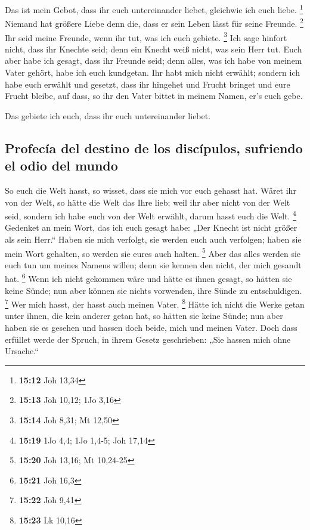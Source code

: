  Das ist mein Gebot, dass ihr euch untereinander liebet,
gleichwie ich euch liebe. \footnote{\textbf{15:12} Joh 13,34}
 Niemand hat größere Liebe denn die, dass er sein Leben
lässt für seine Freunde. \footnote{\textbf{15:13} Joh 10,12; 1Jo 3,16}
 Ihr seid meine Freunde, wenn ihr tut, was ich euch
gebiete. \footnote{\textbf{15:14} Joh 8,31; Mt 12,50} 
Ich sage hinfort nicht, dass ihr Knechte seid; denn ein Knecht weiß
nicht, was sein Herr tut. Euch aber habe ich gesagt, dass ihr Freunde
seid; denn alles, was ich habe von meinem Vater gehört, habe ich euch
kundgetan.  Ihr habt mich nicht erwählt; sondern ich habe
euch erwählt und gesetzt, dass ihr hingehet und Frucht bringet und eure
Frucht bleibe, auf dass, so ihr den Vater bittet in meinem Namen, er's
euch gebe.

 Das gebiete ich euch, dass ihr euch untereinander
liebet.

\hypertarget{profecuxeda-del-destino-de-los-discuxedpulos-sufriendo-el-odio-del-mundo}{%
\subsection{Profecía del destino de los discípulos, sufriendo el odio
del
mundo}\label{profecuxeda-del-destino-de-los-discuxedpulos-sufriendo-el-odio-del-mundo}}

 So euch die Welt hasst, so wisset, dass sie mich vor
euch gehasst hat.  Wäret ihr von der Welt, so hätte die
Welt das Ihre lieb; weil ihr aber nicht von der Welt seid, sondern ich
habe euch von der Welt erwählt, darum hasst euch die Welt. \footnote{\textbf{15:19}
  1Jo 4,4; 1Jo 1,4-5; Joh 17,14}  Gedenket an mein Wort,
das ich euch gesagt habe: „Der Knecht ist nicht größer als sein Herr.``
Haben sie mich verfolgt, sie werden euch auch verfolgen; haben sie mein
Wort gehalten, so werden sie eures auch halten. \footnote{\textbf{15:20}
  Joh 13,16; Mt 10,24-25}  Aber das alles werden sie euch
tun um meines Namens willen; denn sie kennen den nicht, der mich gesandt
hat. \footnote{\textbf{15:21} Joh 16,3}  Wenn ich nicht
gekommen wäre und hätte es ihnen gesagt, so hätten sie keine Sünde; nun
aber können sie nichts vorwenden, ihre Sünde zu entschuldigen.
\footnote{\textbf{15:22} Joh 9,41}  Wer mich hasst, der
hasst auch meinen Vater. \footnote{\textbf{15:23} Lk 10,16}
 Hätte ich nicht die Werke getan unter ihnen, die kein
anderer getan hat, so hätten sie keine Sünde; nun aber haben sie es
gesehen und hassen doch beide, mich und meinen Vater. 
Doch dass erfüllet werde der Spruch, in ihrem Gesetz geschrieben: „Sie
hassen mich ohne Ursache.``

